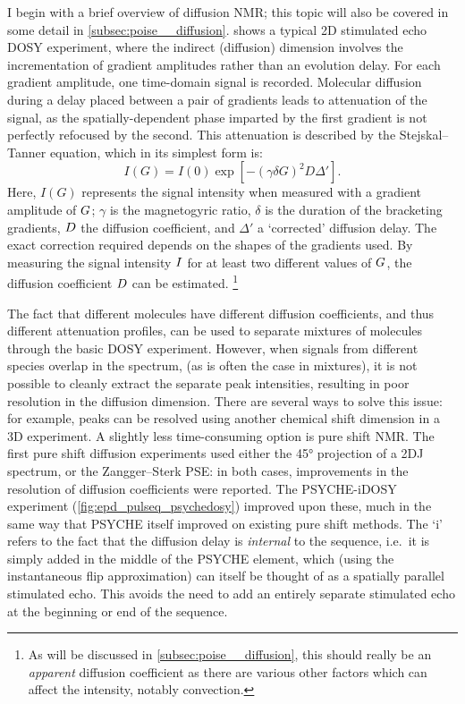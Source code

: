 I begin with a brief overview of diffusion NMR\autocite{Johnson1999PNMRS}; this topic will also be covered in some detail in \cref{subsec:poise__diffusion}.
 shows a typical 2D stimulated echo DOSY experiment, where the indirect (diffusion) dimension involves the incrementation of gradient amplitudes rather than an evolution delay.
For each gradient amplitude, one time-domain signal is recorded.
Molecular diffusion during a delay placed between a pair of gradients leads to attenuation of the signal, as the spatially-dependent phase imparted by the first gradient is not perfectly refocused by the second.
This attenuation is described by the Stejskal--Tanner equation\autocite{Stejskal1965JCP,Sinnaeve2012CMR}, which in its simplest form is:
\begin{equation}
    \label{eq:stejskal_tanner}
    I(G) = I(0) \exp\left[-(\gamma\delta G)^2 D \Delta'\right].
\end{equation}
Here, $I(G)$ represents the signal intensity when measured with a gradient amplitude of $G\/$; $\gamma$ is the magnetogyric ratio, $\delta$ is the duration of the bracketing gradients, $D\/$ the diffusion coefficient, and $\Delta'$ a `corrected' diffusion delay.
The exact correction required depends on the shapes of the gradients used.
By measuring the signal intensity $I\/$ for at least two different values of $G\/$, the diffusion coefficient $D\/$ can be estimated.%
\footnote{As will be discussed in \cref{subsec:poise__diffusion}, this should really be an \textit{apparent} diffusion coefficient as there are various other factors which can affect the intensity, notably convection.}

The fact that different molecules have different diffusion coefficients, and thus different attenuation profiles, can be used to separate mixtures of molecules through the basic DOSY experiment.
However, when signals from different species overlap in the \proton{} spectrum, (as is often the case in mixtures), it is not possible to cleanly extract the separate peak intensities, resulting in poor resolution in the diffusion dimension.
There are several ways to solve this issue: for example, peaks can be resolved using another chemical shift dimension in a 3D experiment.
A slightly less time-consuming option is pure shift NMR.
The first pure shift diffusion experiments used either the \ang{45} projection of a 2DJ spectrum\autocite{Cobas2004JMR}, or the Zangger--Sterk PSE\autocite{Nilsson2007CC,Aguilar2010ACIE,Glanzer2014CEJ}: in both cases, improvements in the resolution of diffusion coefficients were reported.
The PSYCHE-iDOSY experiment\autocite{Foroozandeh2016ACIE} (\cref{fig:epd_pulseq_psychedosy}) improved upon these, much in the same way that PSYCHE itself improved on existing pure shift methods.
The `i' refers to the fact that the diffusion delay is \textit{internal} to the sequence, i.e.\ it is simply added in the middle of the PSYCHE element, which (using the instantaneous flip approximation) can itself be thought of as a spatially parallel stimulated echo.
This avoids the need to add an entirely separate stimulated echo at the beginning or end of the sequence.


